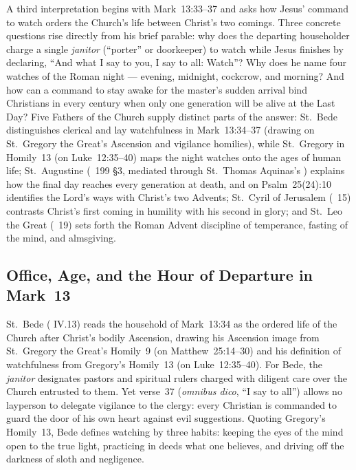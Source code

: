 
A third interpretation begins with Mark~13:33--37 and asks how Jesus' command to watch orders the Church's life between Christ's two comings. Three concrete questions rise directly from his brief parable: why does the departing householder charge a single \emph{janitor} (``porter'' or doorkeeper) to watch while Jesus finishes by declaring, ``And what I say to you, I say to all: Watch''? Why does he name four watches of the Roman night --- evening, midnight, cockcrow, and morning? And how can a command to stay awake for the master's sudden arrival bind Christians in every century when only one generation will be alive at the Last Day? Five Fathers of the Church supply distinct parts of the answer: St.~Bede distinguishes clerical and lay watchfulness in Mark~13:34--37 (drawing on St.~Gregory the Great's Ascension and vigilance homilies), while St.~Gregory in Homily~13 (on Luke~12:35--40) maps the night watches onto the ages of human life; St.~Augustine (~199 §3, mediated through St.~Thomas Aquinas's ) explains how the final day reaches every generation at death, and on Psalm~25(24):10 identifies the Lord's ways with Christ's two Advents; St.~Cyril of Jerusalem (~15) contrasts Christ's first coming in humility with his second in glory; and St.~Leo the Great (~19) sets forth the Roman Advent discipline of temperance, fasting of the mind, and almsgiving.

\subsection{Office, Age, and the Hour of Departure in Mark~13}

St.~Bede ( IV.13) reads the household of Mark~13:34 as the ordered life of the Church after Christ's bodily Ascension, drawing his Ascension image from St.~Gregory the Great's Homily~9 (on Matthew~25:14--30) and his definition of watchfulness from Gregory's Homily~13 (on Luke~12:35--40). For Bede, the \emph{janitor} designates pastors and spiritual rulers charged with diligent care over the Church entrusted to them. Yet verse~37 (\emph{omnibus dico}, ``I say to all'') allows no layperson to delegate vigilance to the clergy: every Christian is commanded to guard the door of his own heart against evil suggestions. Quoting Gregory's Homily~13, Bede defines watching by three habits: keeping the eyes of the mind open to the true light, practicing in deeds what one believes, and driving off the darkness of sloth and negligence.

